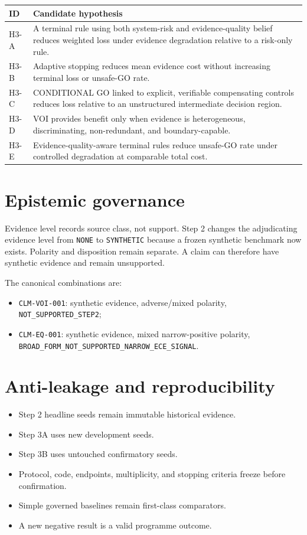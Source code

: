 \documentclass[11pt,a4paper]{report}
\begin{document}
\begin{longtable}{p{}p{}}
\toprule
ID & Candidate hypothesis \\
\midrule
H3-A & A terminal rule using both system-risk and evidence-quality belief reduces weighted loss under evidence degradation relative to a risk-only rule. \\
H3-B & Adaptive stopping reduces mean evidence cost without increasing terminal loss or unsafe-GO rate. \\
H3-C & CONDITIONAL GO linked to explicit, verifiable compensating controls reduces loss relative to an unstructured intermediate decision region. \\
H3-D & VOI provides benefit only when evidence is heterogeneous, discriminating, non-redundant, and boundary-capable. \\
H3-E & Evidence-quality-aware terminal rules reduce unsafe-GO rate under controlled degradation at comparable total cost. \\
\bottomrule
\end{longtable}

\chapter{Epistemic governance}

Evidence level records source class, not support. Step 2 changes the adjudicating evidence level from \texttt{NONE} to \texttt{SYNTHETIC} because a frozen synthetic benchmark now exists. Polarity and disposition remain separate. A claim can therefore have synthetic evidence and remain unsupported.

The canonical combinations are:
\begin{itemize}
  \item \texttt{CLM-VOI-001}: synthetic evidence, adverse/mixed polarity, \texttt{NOT\_SUPPORTED\_STEP2};
  \item \texttt{CLM-EQ-001}: synthetic evidence, mixed narrow-positive polarity, \texttt{BROAD\_FORM\_NOT\_SUPPORTED\_NARROW\_ECE\_SIGNAL}.
\end{itemize}

\chapter{Anti-leakage and reproducibility}

\begin{itemize}
  \item Step 2 headline seeds remain immutable historical evidence.
  \item Step 3A uses new development seeds.
  \item Step 3B uses untouched confirmatory seeds.
  \item Protocol, code, endpoints, multiplicity, and stopping criteria freeze before confirmation.
  \item Simple governed baselines remain first-class comparators.
  \item A new negative result is a valid programme outcome.
\end{itemize}
\end{document}
